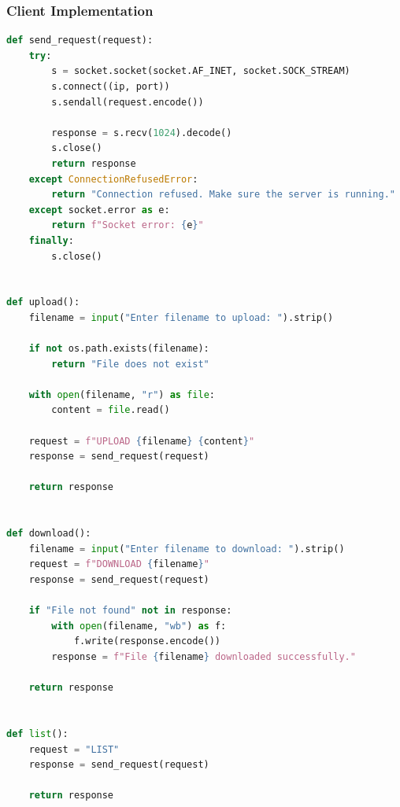 \documentclass[a4paper,12pt]{article}
\begin{document}
\subsubsection*{Client Implementation}
\begin{lstlisting}[language=Python, caption=Client Implementation, label=lst:client, basicstyle=\ttfamily\footnotesize, keywordstyle=\color{blue}]
def send_request(request):
    try:
        s = socket.socket(socket.AF_INET, socket.SOCK_STREAM)
        s.connect((ip, port))
        s.sendall(request.encode())

        response = s.recv(1024).decode()
        s.close()
        return response
    except ConnectionRefusedError:
        return "Connection refused. Make sure the server is running."
    except socket.error as e:
        return f"Socket error: {e}"
    finally:
        s.close()


def upload():
    filename = input("Enter filename to upload: ").strip()

    if not os.path.exists(filename):
        return "File does not exist"

    with open(filename, "r") as file:
        content = file.read()

    request = f"UPLOAD {filename} {content}"
    response = send_request(request)

    return response


def download():
    filename = input("Enter filename to download: ").strip()
    request = f"DOWNLOAD {filename}"
    response = send_request(request)

    if "File not found" not in response:
        with open(filename, "wb") as f:
            f.write(response.encode())
        response = f"File {filename} downloaded successfully."

    return response


def list():
    request = "LIST"
    response = send_request(request)

    return response

\end{lstlisting}
\end{document}
